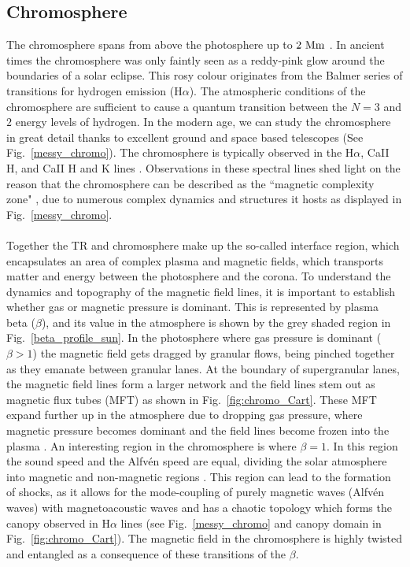 \documentclass[12pt]{ociamthesis}
\newcommand{\Alfven}{Alfv\'{e}n }
\newcommand{\np}{\\ \\}
\begin{document}
\subsection{Chromosphere}
\label{ssec:Chromosphere}
The chromosphere spans from above the photosphere up to $2~\rm{Mm}$ \citep{Lang_2006ses}. In ancient times the chromosphere was only faintly seen as a reddy-pink glow around the boundaries of a solar eclipse. This rosy colour originates from the Balmer series of transitions for hydrogen emission (H$\alpha$). The atmospheric conditions of the chromosphere are sufficient to cause a quantum transition between the $N=3$ and $2$ energy levels of hydrogen. In the modern age, we can study the chromosphere in great detail thanks to excellent ground and space based telescopes (See Fig.~\ref{messy_chromo}). The chromosphere is typically observed in the H$\alpha$, CaII H, and CaII H and K lines \citep{Ayres2019sgspbook27A}. Observations in these spectral lines shed light on the reason that the chromosphere can be described as the ``magnetic complexity zone" \citep{Ayres2009astro2010S9A}, due to numerous complex dynamics and structures it hosts as displayed in Fig.~\ref{messy_chromo}. \np  
%
Together the TR and chromosphere make up the so-called interface region, which encapsulates an area of complex plasma and magnetic fields, which transports matter and energy between the photosphere and the corona. To understand the dynamics and topography of the magnetic field lines, it is important to establish whether gas or magnetic pressure is dominant. This is represented by plasma beta ($\beta$), and its value in the atmosphere is shown by the grey shaded region in Fig.~\ref{beta_profile_sun}. In the photosphere where gas pressure is dominant ($\beta>1$) the magnetic field gets dragged by granular flows, being pinched together as they emanate between granular lanes. At the boundary of supergranular lanes, the magnetic field lines form a larger network and the field lines stem out as magnetic flux tubes (MFT) as shown in Fig.~\ref{fig:chromo_Cart}. These MFT expand further up in the atmosphere due to dropping gas pressure, where magnetic pressure becomes dominant and the field lines become frozen into the plasma \citep{Ayres2009astro2010S9A}. An interesting region in the chromosphere is where $\beta=1$. In this region the sound speed and the \Alfven speed are equal, dividing the solar atmosphere into magnetic and non-magnetic regions \citep{Tsiropoula2012}. This region can lead to the formation of shocks, as it allows for the mode-coupling of purely magnetic waves (\Alfven waves) with magnetoacoustic waves \citep{Hollweg1982SoPh7535H, Rosenthal2002ApJ564508R,Bogdan2003ApJ599626B, Cally2008SoPh251251C, Wang2020ApJ891110W} and has a chaotic topology which forms the canopy observed in H$\alpha$ lines (see Fig.~\ref{messy_chromo} and canopy domain in Fig.~\ref{fig:chromo_Cart}). The magnetic field in the chromosphere is highly twisted and entangled as a consequence of these transitions of the $\beta$. \np
\end{document}
